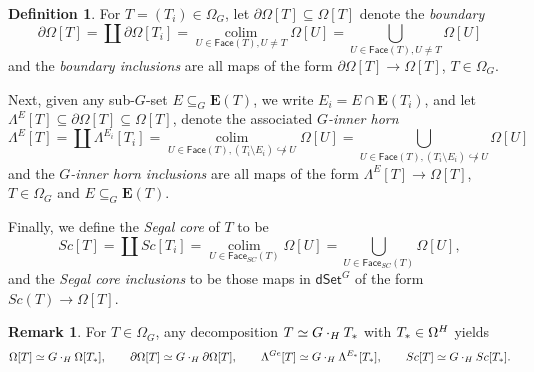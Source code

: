 \documentclass[a4paper,10pt
,draft
]{article}%
\numberwithin{equation}{section}
\numberwithin{figure}{section}
\theoremstyle{definition} %
\newtheorem{definition}[equation]{Definition}%
\newtheorem{remark}[equation]{Remark}%
\newcommand{\into}{\hookrightarrow}%
\newcommand{\dSet}{\mathsf{dSet}}
\DeclareMathOperator{\colim}{colim}%
\newcommand{\1}{\ensuremath{\mathbbm 1}}%
\begin{document}
\begin{definition}
      \label{DSETPRESHEAF_DEF}
      For $T = (T_i) \in \Omega_G$, let $\partial \Omega[T] \subseteq \Omega[T]$ denote the \textit{boundary}
      \begin{equation}
            \partial \Omega[T] = \coprod \partial \Omega[T_i]
            = \mathop{\colim}\limits_{U \in \mathsf{Face}(T), U \neq T} \Omega[U]
            = \bigcup_{U \in \mathsf{Face}(T), U \neq T} \Omega[U]
      \end{equation}
      and the \textit{boundary inclusions} are all maps of the form
      $\partial \Omega[T] \to \Omega[T]$, $T \in \Omega_G$.

      Next, given any sub-$G$-set $E \subseteq_G \boldsymbol{E}(T)$, we write $E_i = E \cap \boldsymbol{E}(T_i)$, and let
      $\Lambda^{E}[T] \subseteq \partial \Omega[T] \subseteq \Omega[T]$,
      denote the associated \textit{$G$-inner horn}
      \begin{equation}
            \label{GINNERHORN_EQ}
            \Lambda^{E}[T] = \coprod \Lambda^{E_i}[T_i]
            = \mathop{\colim}\limits_{U \in \mathsf{Face}(T), (T_i \setminus E_i) \not\into U} \Omega[U]
            = \bigcup_{U \in \mathsf{Face}(T), (T_i \setminus E_i) \not\into U} \Omega[U]
      \end{equation}
      and the \textit{$G$-inner horn inclusions} are all maps of the form
      $\Lambda^{E}[T] \to \Omega[T]$, $T \in \Omega_G$ and $E \subseteq_G \boldsymbol{E}(T)$.

      Finally, we define the \textit{Segal core} of $T$ to be
      \begin{equation}
            \label{eq:SC}
            Sc[T] = \coprod Sc[T_i]
            = \mathop{\colim}\limits_{U \in \mathsf{Face}_{SC}(T)} \Omega[U]
            = \bigcup_{U \in \mathsf{Face}_{SC}(T)} \Omega[U],
      \end{equation}
      and the \textit{Segal core inclusions} to be those maps in $\dSet^G$ of the form
      $Sc(T) \to \Omega[T]$.
\end{definition}


\begin{remark}
      For $T \in \Omega_G$, any decomposition $T \simeq G \cdot_H T_{\**}$ with $T_{\**} \in \Omega^H$ yields
      \[
            \Omega[T] \simeq G \cdot_H \Omega[T_{\**}],
            \qquad
            \partial\Omega[T] \simeq G \cdot_H \partial \Omega[T],
            \qquad
            \Lambda^{Ge}[T] \simeq G \cdot_H \Lambda^{E_{\**}}[T_{\**}],
            \qquad
            Sc[T] \simeq G \cdot_H Sc[T_{\**}].
      \]
\end{remark}
\end{document}
